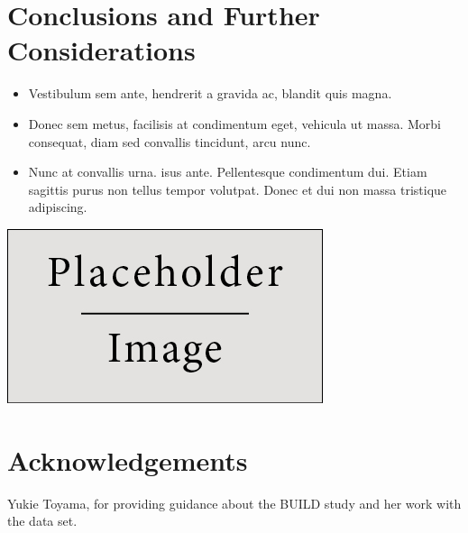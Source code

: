 \documentclass[a0,landscape]{a0poster}
\begin{document}
\begin{multicols}{3}
\section*{Conclusions and Further Considerations}

\begin{itemize}
\item Vestibulum sem ante, hendrerit a gravida ac, blandit quis magna.
\item Donec sem metus, facilisis at condimentum eget, vehicula ut massa. Morbi consequat, diam sed convallis tincidunt, arcu nunc.
\item Nunc at convallis urna. isus ante. Pellentesque condimentum dui. Etiam sagittis purus non tellus tempor volutpat. Donec et dui non massa tristique adipiscing.
\end{itemize}

\color{DarkSlateGray} %

\begin{center}\vspace{1cm}
\includegraphics[width=0.8\linewidth]{placeholder}
\end{center}\vspace{1cm}


\section*{Acknowledgements}

Yukie Toyama, for providing guidance about the BUILD study and her work with the data set.


\end{multicols}
\end{document}
